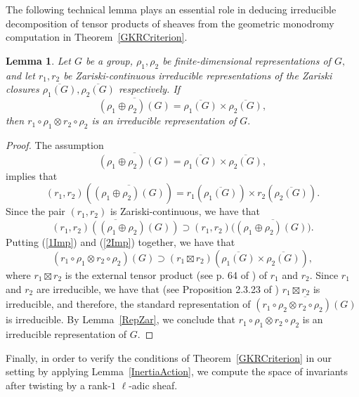 \documentclass[12pt]{amsart}
\newtheorem{lemma}[theorem]{Lemma}
\theoremstyle{definition}
\theoremstyle{remark}
\numberwithin{equation}{section}
\begin{document}
The following technical lemma plays an essential role in deducing irreducible decomposition of tensor products of sheaves from the geometric monodromy computation in Theorem~\ref{GKRCriterion}.

\begin{lemma}\label{geoMonTens}
    Let $G$ be a group, $\rho_1,\rho_2$ be finite-dimensional representations of $G,$ and let $r_1,r_2$ be Zariski-continuous irreducible representations of the Zariski closures $\overline{\rho_1(G)},\overline{\rho_2(G)}$ respectively. If 
    $$
    \overline{(\rho_1\oplus\rho_2)(G)}=\overline{\rho_1(G)}\times\overline{\rho_2(G)},
    $$
    then $r_1\circ\rho_1\otimes r_2\circ\rho_2$ is an irreducible representation of $G.$
\end{lemma}

\begin{proof}
    The assumption
    $$
    \overline{(\rho_1\oplus\rho_2)(G)}=\overline{\rho_1(G)}\times\overline{\rho_2(G)},
    $$ 
    implies that
    \begin{equation}\label{1Imp}
    (r_1,r_2)(\overline{(\rho_1\oplus\rho_2)(G)})=r_1(\overline{\rho_1(G)})\times r_2(\overline{\rho_2(G)}).
    \end{equation}
    Since the pair $(r_1,r_2)$ is Zariski-continuous, we have that
    \begin{equation}\label{2Imp}
    \overline{(r_1,r_2)((\rho_1\oplus\rho_2)(G))}\supset (r_1,r_2)(\overline{(\rho_1\oplus\rho_2)(G))}.
    \end{equation}
    Putting (\ref{1Imp}) and (\ref{2Imp}) together, we have that
    $$
    \overline{(r_1\circ\rho_1\otimes r_2\circ\rho_2)(G)}\supset(r_1\boxtimes r_2)(\overline{\rho_1(G)}\times\overline{\rho_2(G)}),
    $$
    where $r_1\boxtimes r_2$ is the external tensor product (see p. 64 of \cite{KowalskiRep}) of $r_1$ and $r_2.$ Since $r_1$ and $r_2$ are irreducible, we have that (see Proposition 2.3.23 of \cite{KowalskiRep}) $r_1\boxtimes r_2$ is irreducible, and therefore, the standard representation of $\overline{(r_1\circ\rho_2\otimes r_2\circ\rho_2)(G)}$ is irreducible. By Lemma~\ref{RepZar}, we conclude that $r_1\circ\rho_1\otimes r_2\circ\rho_2$ is an irreducible representation of $G.$
    
\end{proof}

Finally, in order to verify the conditions of Theorem~\ref{GKRCriterion} in our setting by applying Lemma~\ref{InertiaAction}, we compute the space of invariants after twisting by a rank-$1$ $\ell$-adic sheaf.
\end{document}
